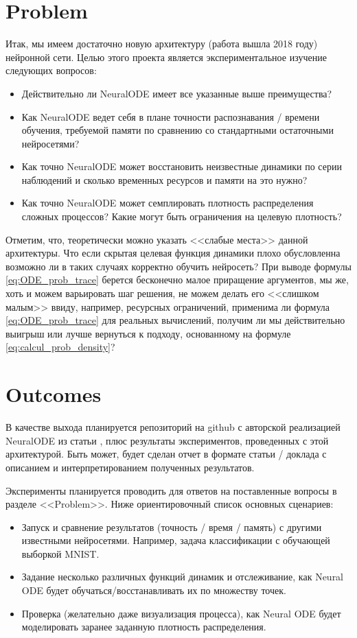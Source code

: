 \documentclass[]{scrartcl}
\begin{document}
\section{Problem}
Итак, мы имеем достаточно новую архитектуру (работа \cite{NeuralODE} вышла 2018 году) нейронной сети. Целью этого проекта является экспериментальное изучение следующих вопросов: 
\begin{itemize}
\item Действительно ли NeuralODE имеет все указанные выше преимущества?
\item Как NeuralODE ведет себя в плане точности распознавания / времени обучения, требуемой памяти по сравнению со стандартными остаточными нейросетями?
\item Как точно NeuralODE может восстановить неизвестные динамики по серии наблюдений и сколько временных ресурсов и памяти на это нужно?
\item Как точно NeuralODE может семплировать плотность распределения сложных процессов? Какие могут быть ограничения на целевую плотность?  
\end{itemize}
Отметим, что, теоретически можно указать <<слабые места>> данной архитектуры. Что если скрытая целевая функция динамики плохо обусловленна возможно ли в таких случаях корректно обучить нейросеть? При выводе формулы \eqref{eq:ODE_prob_trace} берется бесконечно малое приращение аргументов, мы же, хоть и можем варьировать шаг решения, не можем делать его <<слишком малым>> ввиду, например, ресурсных ограничений, применима ли формула \eqref{eq:ODE_prob_trace} для реальных вычислений, получим ли мы действительно выигрыш или лучше вернуться к подходу, основанному на формуле \eqref{eq:calcul_prob_density}?

\section{Outcomes}
В качестве выхода планируется репозиторий на github с авторской реализацией NeuralODE из статьи \cite{NeuralODE}, плюс результаты экспериментов, проведенных с этой архитектурой. Быть может, будет сделан отчет в формате статьи / доклада с описанием и интерпретированием полученных  результатов.

Эксперименты планируется проводить для ответов  на поставленные вопросы в разделе <<Problem>>. Ниже ориентировочный список основных сценариев:
\begin{itemize}
\item Запуск и сравнение результатов (точность / время / память) с другими известными нейросетями. Например, задача классификации с обучающей выборкой MNIST.
\item Задание несколько различных функций динамик и отслеживание, как Neural ODE будет обучаться/восстанавливать их по множеству точек.
\item Проверка (желательно даже визуализация процесса), как Neural ODE будет моделировать заранее заданную плотность распределения.
\end{itemize} 
\end{document}
